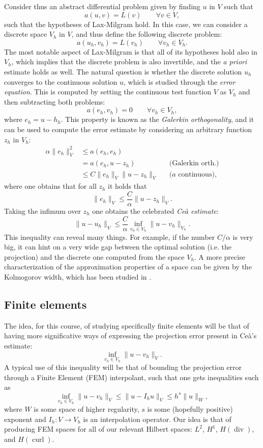 \documentclass{article}
\DeclareMathOperator{\dive}{\text{div}}
\DeclareMathOperator{\curl}{\text{curl}}
\begin{document}
Consider thus an abstract differential problem given by finding $u$ in $V$ such that
    $$ a(u, v) = L(v) \qquad \forall v \in V, $$
such that the hypotheses of Lax-Milgram hold. In this case, we can consider a discrete space $V_h$ in $V$, and thus define the following discrete problem: 
    $$ a(u_h, v_h) = L(v_h) \qquad \forall v_h \in V_h. $$
The most notable aspect of Lax-Milgram is that all of its hypotheses hold also in $V_h$, which implies that the discrete problem is also invertible, and the \emph{a priori} estimate holds as well. The natural question is whether the discrete solution $u_h$ converges to the continuous solution $u$, which is studied through the \emph{error equation}. This is computed by setting the continuous test function $V$ as $V_h$ and then subtracting both problems: 
    $$ a(e_h, v_h) = 0 \qquad \forall v_h \in V_h, $$
where $e_h = u - h_h$.  This property is known as the \emph{Galerkin orthogonality}, and it can be used to compute the error estimate by considering an arbitrary function $z_h$ in $V_h$:
    $$ \begin{aligned}
        \alpha \| e_h \|_V^2 &\leq a(e_h, e_h) && \\ 
                             &= a(e_h, u - z_h) && \text{(Galerkin orth.)} \\
                             &\leq C\|e_h\|_V \|u - z_h\|_V &&\text{($a$ continuous)},
        \end{aligned} $$
where one obtains that for all $z_h$ it holds that
    $$ \| e_h \|_V \leq \frac C \alpha \|u - z_h\|_V. $$
Taking the infimum over $z_h$ one obtains the celebrated \emph{Ceà estimate}: 
    $$ \| u - u_h \|_V \leq \frac C \alpha \inf_{v_h\in V_h} \|u - v_h\|_{V_h}. $$
This inequality can reveal many things. For example, if the number $C/\alpha$ is very big, it can hint on a very wide gap between the optimal solution (i.e. the projection) and the discrete one computed from the space $V_h$. A more precise characterization of the approximation properties of a space can be given by the Kolmogorov width, which has been studied in \cite{evans2009n}.



\subsection{Finite elements} 

The idea, for this course, of studying specifically finite elements will be that of having more significative ways of expressing the projection error present in Ceà's estimate: 
    $$ \inf_{v_h\in V_h} \| u - v_h\|_V. $$
A typical use of this inequality will be that of bounding the projection error through a Finite Element (FEM) interpolant, such that one gets inequalities such as
    $$ \inf_{v_h\in V_h} \| u - v_h\|_V \leq \| u - I_h u \|_V \leq h^s \|u \|_W, $$
where $W$ is some space of higher regularity, $s$ is some (hopefully positive) exponent and $I_h:V \to V_h$ is an interpolation operator. Our idea is that of producing FEM spaces for all of our relevant Hilbert spaces: $L^2$, $H^1$, $H(\dive)$, and $H(\curl)$. 
\end{document}
